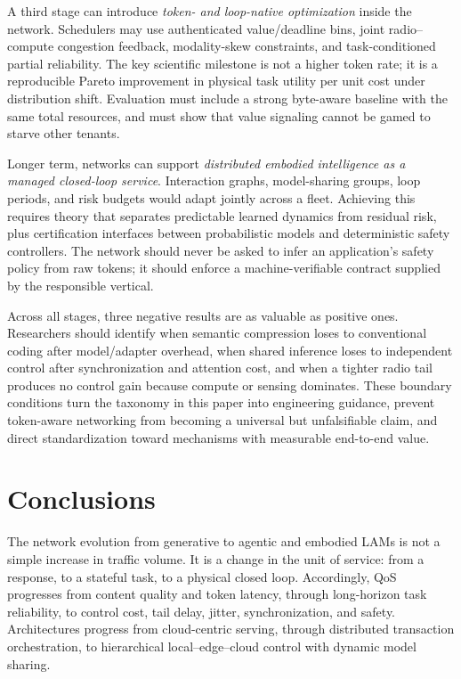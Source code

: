 \documentclass[letterpaper,journal]{IEEEtran}
\begin{document}
A third stage can introduce \emph{token- and loop-native optimization} inside
the network. Schedulers may use authenticated value/deadline bins, joint
radio--compute congestion feedback, modality-skew constraints, and
task-conditioned partial reliability. The key scientific milestone is not a
higher token rate; it is a reproducible Pareto improvement in physical task
utility per unit cost under distribution shift. Evaluation must include a
strong byte-aware baseline with the same total resources, and must show that
value signaling cannot be gamed to starve other tenants.

Longer term, networks can support \emph{distributed embodied intelligence as a
managed closed-loop service}. Interaction graphs, model-sharing groups, loop
periods, and risk budgets would adapt jointly across a fleet. Achieving this
requires theory that separates predictable learned dynamics from residual
risk, plus certification interfaces between probabilistic models and
deterministic safety controllers. The network should never be asked to infer
an application's safety policy from raw tokens; it should enforce a
machine-verifiable contract supplied by the responsible vertical.

Across all stages, three negative results are as valuable as positive ones.
Researchers should identify when semantic compression loses to conventional
coding after model/adapter overhead, when shared inference loses to independent
control after synchronization and attention cost, and when a tighter radio
tail produces no control gain because compute or sensing dominates. These
boundary conditions turn the taxonomy in this paper into engineering
guidance, prevent token-aware networking from becoming a universal but
unfalsifiable claim, and direct standardization toward mechanisms with
measurable end-to-end value.

\section{Conclusions}
\label{sec:conclusion}
The network evolution from generative to agentic and embodied LAMs is not a
simple increase in traffic volume. It is a change in the unit of service:
from a response, to a stateful task, to a physical closed loop. Accordingly,
QoS progresses from content quality and token latency, through long-horizon
task reliability, to control cost, tail delay, jitter, synchronization, and
safety. Architectures progress from cloud-centric serving, through
distributed transaction orchestration, to hierarchical local--edge--cloud
control with dynamic model sharing.
\end{document}
